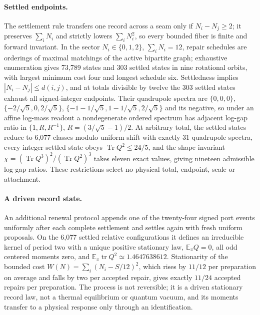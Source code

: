 \documentclass[11pt]{article}
\begin{document}
\paragraph{Settled endpoints.}
The settlement rule transfers one record across a seam only if
\(N_i-N_j\ge2\); it preserves \(\sum_iN_i\) and strictly lowers
\(\sum_iN_i^2\), so every bounded fiber is finite and forward invariant. In the
sector \(N_i\in\{0,1,2\}\), \(\sum_iN_i=12\), repair schedules are orderings of
maximal matchings of the active bipartite graph; exhaustive enumeration gives
73,789 states and 303 settled states in nine rotational orbits, with largest
minimum cost four and longest schedule six. Settledness implies
\(|N_i-N_j|\le d(i,j)\), and at totals divisible by twelve the 303 settled
states exhaust all signed-integer endpoints. Their quadrupole spectra are
\(\{0,0,0\}\), \(\{-2/\sqrt5,0,2/\sqrt5\}\),
\(\{-1-1/\sqrt5,1-1/\sqrt5,2/\sqrt5\}\) and its negative, so under an
affine log-mass readout a nondegenerate ordered spectrum has adjacent
log-gap ratio in \(\{1,R,R^{-1}\}\), \(R=(3/\sqrt5-1)/2\). At arbitrary total,
the settled states reduce to 6,077 classes modulo uniform shift with exactly
31 quadrupole spectra, every integer settled state obeys
\(\operatorname{Tr}Q^2\le24/5\), and the shape invariant
\(\chi=(\operatorname{Tr}Q^3)^2/(\operatorname{Tr}Q^2)^3\) takes eleven exact
values, giving nineteen admissible log-gap ratios. These restrictions select
no physical total, endpoint, scale or attachment.

\paragraph{A driven record state.}
An additional renewal protocol appends one of the twenty-four signed port
events uniformly after each complete settlement and settles again with fresh
uniform proposals. On the 6,077 settled relative configurations it defines an
irreducible kernel of period two with a unique positive stationary law,
\(\mathbb E_\pi Q=0\), all odd centered moments zero, and
\(\mathbb E_\pi\operatorname{tr}Q^2\simeq1.4647638612\). Stationarity of the
bounded cost \(W(N)=\sum_i(N_i-S/12)^2\), which rises by \(11/12\) per
preparation on average and falls by two per accepted repair, gives exactly
\(11/24\) accepted repairs per preparation. The process is not reversible;
it is a driven stationary record law, not a thermal equilibrium or quantum
vacuum, and its moments transfer to a physical response only through an
identification.
\end{document}
